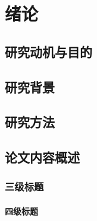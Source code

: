 \section{绪论}


\subsection{研究动机与目的}

\subsection{研究背景}


\subsection{研究方法}

\subsection{论文内容概述}

\subsubsection{三级标题}

\paragraph{\noindent 四级标题}

\newpage

